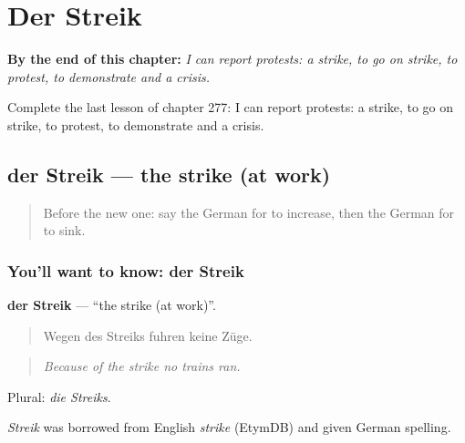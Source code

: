 
\chapter{Der Streik}
\label{ch:ge-der-streik}

\begin{chapteropening}
\textbf{By the end of this chapter:} \emph{I can report protests: a strike, to go on strike, to protest, to demonstrate and a crisis.}

Complete the last lesson of chapter 277: I can report protests: a strike, to go on strike, to protest, to demonstrate and a crisis.
\end{chapteropening}

\section[der Streik]{der Streik — the strike (at work)}

\label{lesson:GE-C277-streik}



\begin{quote}
Before the new one: say the German for to increase, then the German for to sink.
\end{quote}

\subsection*{You'll want to know: der Streik}
\textbf{der Streik} — \textquotedblleft{}the strike (at work)\textquotedblright{}.

\begin{quote}
Wegen des Streiks fuhren keine Züge.
\end{quote}

\begin{quote}
\emph{Because of the strike no trains ran.}
\end{quote}

Plural: \emph{die Streiks}.

\begin{cousinweb}
\emph{Streik} was borrowed from English \emph{strike} (EtymDB) and given German spelling.
\end{cousinweb}

